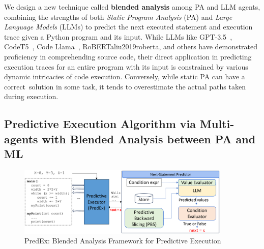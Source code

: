 
We design a new technique called {\bf blended analysis} among PA and LLM
agents, combining the strengths of both {\em Static Program Analysis}
(PA) and {\em Large Language Models} (LLMs) to predict the next
executed statement and execution trace given a Python program and its
input. While LLMs like GPT-3.5~\cite{GPT3.5},
CodeT5~\cite{wang2023codet5}, Code Llama~\cite{code_llama},
RoBERTa{liu2019roberta}, and others have demonstrated proficiency in
comprehending source code, their direct application in predicting
execution traces for an entire program with its input is constrained
by various dynamic intricacies of code execution. Conversely, while
static PA can have a correct~solution in some task, it tends to
overestimate the actual paths taken during execution.

\subsection{Predictive Execution Algorithm via Multi-agents with Blended Analysis between PA and ML}

\begin{figure}
\begin{center}
\includegraphics[width=4in]{overview-4.png}
\vspace{-22pt}
\caption{PredEx: Blended Analysis Framework for Predictive Execution}
\label{fig:overview}
\end{center}
\end{figure}

